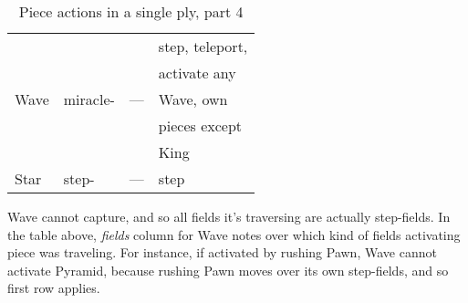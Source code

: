 \begin{table}[!h]
\begin{tabular}{ llll }
\cmidrule{1-4} %
\multirow{5}{*}{Wave}       & \multirow{5}{*}{miracle\footnotemark[4]-}
                                                        & \multirow{5}{*}{---}          & step, teleport,           \\
                            &                           &                               & activate any              \\
                            &                           &                               & Wave, own                 \\
                            &                           &                               & pieces except             \\
                            &                           &                               & King                      \\
\cmidrule{1-4} %
Star                        & step-                     & ---                           & step                      \\
\bottomrule %
\end{tabular}
\caption{Piece actions in a single ply, part 4}
\label{tbl:Appendix/Summary/Piece actions, part 4}
\end{table}


Wave cannot capture, and so all fields it's traversing are actually step-fields.
In the table above, \emph{fields} column for Wave notes over which kind of fields
activating piece was traveling. For instance, if activated by rushing Pawn, Wave
cannot activate Pyramid, because rushing Pawn moves over its own step-fields, and
so first row applies.

\clearpage %

